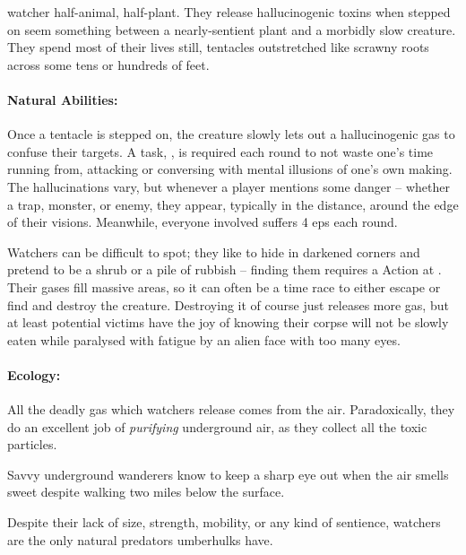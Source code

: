 \begin{multicols}{2}
\umberhulk

  {watcher}%
  {half-animal, half-plant. They release hallucinogenic toxins when stepped on}%
seem something between a nearly-sentient plant and a morbidly slow creature.
They spend most of their lives still, tentacles outstretched like scrawny roots across some tens or hundreds of feet.

\paragraph{Natural Abilities:}
Once a tentacle is stepped on, the creature slowly lets out a hallucinogenic gas to confuse their targets.
A  task, \tn[10], is required each round to not waste one's time running from, attacking or conversing with mental illusions of one's own making.
The hallucinations vary, but whenever a player mentions some danger -- whether a trap, monster, or enemy, they appear, typically in the distance, around the edge of their visions.
Meanwhile, everyone involved suffers 4 \glspl{ep} each round.

Watchers can be difficult to spot; they like to hide in darkened corners and pretend to be a shrub or a pile of rubbish -- finding them requires a  Action at \tn[10].
Their gases fill massive areas, so it can often be a time race to either escape or find and destroy the creature.
Destroying it of course just releases more gas, but at least potential victims have the joy of knowing their corpse will not be slowly eaten while paralysed with fatigue by an alien face with too many eyes.

\paragraph{Ecology:}
All the deadly gas which watchers release comes from the air.
Paradoxically, they do an excellent job of \emph{purifying} underground air, as they collect all the toxic particles.

Savvy underground wanderers know to keep a sharp eye out when the air smells sweet despite walking two miles below the surface.

Despite their lack of size, strength, mobility, or any kind of sentience, watchers are the only natural predators umberhulks have.


\watcher


\end{multicols}
